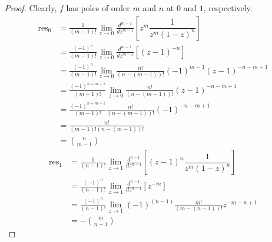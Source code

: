 \documentclass[10pt]{article}
\DeclareMathOperator*{\res}{res}
\begin{document}
\begin{enumerate}
\begin{enumerate}
\begin{proof}
Clearly, $f$ has poles of order $m$ and $n$ at $0$ and $1$, respectively.
\begin{align*}
\res\nolimits_{0} &= \frac{1}{(m-1)!} \lim_{z \rightarrow 0} \frac{d^{m-1}}{dz^{m-1}}[z^m \dfrac{1}{z^m(1-z)^n}]
\\
&= \frac{(-1)^n}{(m-1)!} \lim_{z \rightarrow 0} \frac{d^{m-1}}{dz^{m-1}}[(z-1)^{-n}]
\\
&= \frac{(-1)^n}{(m-1)!} \lim_{z \rightarrow 0} \frac{n!}{(n-(m-1))!}(-1)^{m-1}(z-1)^{-n-m+1}
\\
&= \frac{(-1)^{n+m-1}}{(m-1)!} \lim_{z \rightarrow 0} \frac{n!}{(n-(m-1))!}(z-1)^{-n-m+1}
\\
&= \frac{(-1)^{n+m-1}}{(m-1)!} \frac{n!}{(n-(m-1))!}(-1)^{-n-m+1}
\\
&= \frac{n!}{(m-1)!(n-(m-1))!}
\\
&= \binom{n}{m-1}
\end{align*}
\begin{align*}
\res\nolimits_{1} &= \frac{1}{(n-1)!} \lim_{z \rightarrow 1} \frac{d^{n-1}}{dz^{n-1}}[(z-1)^n \dfrac{1}{z^m(1-z)^n}]
\\
&=\frac{(-1)^n}{(n-1)!} \lim_{z \rightarrow 1} \frac{d^{n-1}}{dz^{n-1}}[z^{-m}]
\\
&=\frac{(-1)^n}{(n-1)!} \lim_{z \rightarrow 1} (-1)^{(n-1)} \frac{m!}{(m-(n-1))!} z^{-m - n + 1}
\\
&=- \binom{m}{n-1}
\end{align*}
\end{proof}
\end{enumerate}
\end{enumerate}
\end{document}
